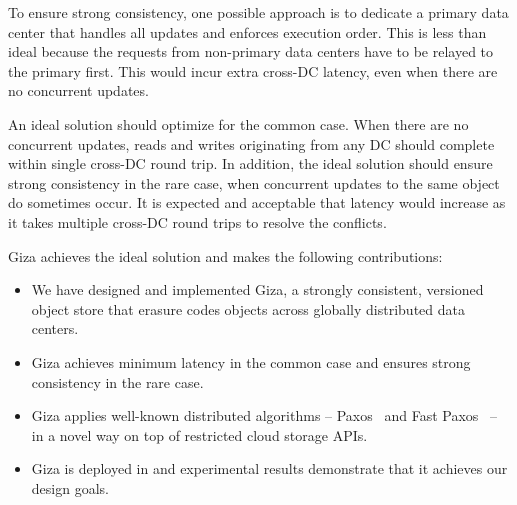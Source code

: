 To ensure strong consistency, one possible approach is to dedicate a primary
data center that handles all updates and enforces execution order. This is less
than ideal because the requests from non-primary data centers have to be relayed
to the primary first. This would incur extra cross-DC latency, even when there are
no concurrent updates.


An ideal solution should optimize for the common case.
When there are no concurrent updates, 
reads and writes originating from any DC should complete within single cross-DC round trip.
In addition, the ideal solution should ensure strong consistency in the rare case,
when concurrent updates to the same object do sometimes occur.
It is expected and acceptable that latency would increase
as it takes multiple cross-DC round trips to resolve the conflicts.

Giza achieves the ideal solution and makes the following contributions:
\begin{itemize}
    \item We have designed and implemented Giza, a strongly consistent,
      versioned object store that erasure codes objects across globally
      distributed data centers.
    \item Giza achieves minimum latency in the common case and ensures strong consistency in the rare case.
    \item Giza applies well-known distributed algorithms -- Paxos~\cite{lamport01paxos}
      and Fast Paxos~\cite{lamport05fast} -- in a novel way on top of restricted cloud storage APIs.
    \item Giza is deployed in \deployment and experimental results demonstrate
      that it achieves our design goals.
\end{itemize}

